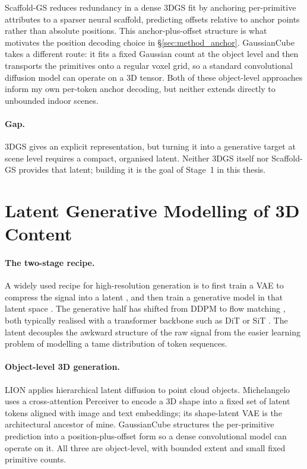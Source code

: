 Scaffold-GS \citep{lu2024scaffold} reduces redundancy in a dense 3DGS fit by anchoring per-primitive attributes to a sparser neural scaffold, predicting offsets relative to anchor points rather than absolute positions. This anchor-plus-offset structure is what motivates the position decoding choice in \S\ref{sec:method_anchor}. GaussianCube \citep{zhang2024gaussiancube} takes a different route: it fits a fixed Gaussian count at the object level and then transports the primitives onto a regular voxel grid, so a standard convolutional diffusion model can operate on a 3D tensor. Both of these object-level approaches inform my own per-token anchor decoding, but neither extends directly to unbounded indoor scenes.
\paragraph{Gap.} 3DGS gives an explicit representation, but turning it into a generative target at scene level requires a compact, organised latent. Neither 3DGS itself nor Scaffold-GS provides that latent; building it is the goal of Stage~1 in this thesis.

\section{Latent Generative Modelling of 3D Content}
\label{sec:rw_gen}

\paragraph{The two-stage recipe.}
A widely used recipe for high-resolution generation is to first train a VAE to compress the signal into a latent \citep{kingma2014vae}, and then train a generative model in that latent space \citep{rombach2022ldm}. The generative half has shifted from DDPM \citep{ho2020ddpm} to flow matching \citep{lipman2023flowmatching, liu2023rectified}, both typically realised with a transformer backbone such as DiT \citep{peebles2023dit} or SiT \citep{ma2024sit}. The latent decouples the awkward structure of the raw signal from the easier learning problem of modelling a tame distribution of token sequences.

\paragraph{Object-level 3D generation.}
LION \citep{zeng2022lion} applies hierarchical latent diffusion to point cloud objects. Michelangelo \citep{zhao2023michelangelo} uses a cross-attention Perceiver \citep{jaegle2021perceiver, jaegle2022perceiverio} to encode a 3D shape into a fixed set of latent tokens aligned with image and text embeddings; its shape-latent VAE is the architectural ancestor of mine. GaussianCube \citep{zhang2024gaussiancube} structures the per-primitive prediction into a position-plus-offset form so a dense convolutional model can operate on it. All three are object-level, with bounded extent and small fixed primitive counts.

